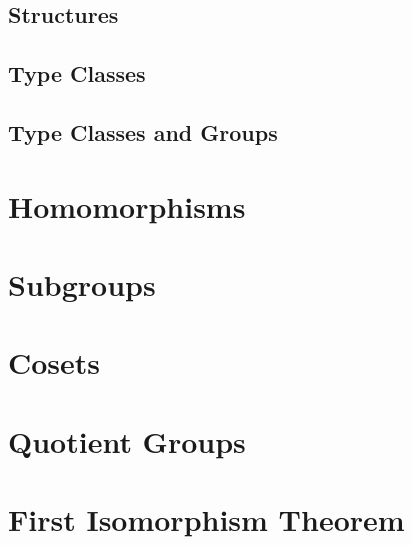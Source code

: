 \documentclass[runningheads,a4paper]{llncs}
\renewcommand{\-}{\setminus}
\begin{document}
\subsection{Structures}

\subsection{Type Classes}

\subsection{Type Classes and Groups}

\section{Homomorphisms}

\section{Subgroups}

\section{Cosets}

\section{Quotient Groups}

\section{First Isomorphism Theorem}



\end{document}
